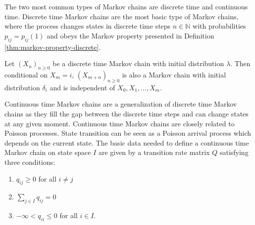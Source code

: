 
The two most common types of Markov chains are discrete time and continuous time.
Discrete time Markov chains are the most basic type of Markov chains, where the process
changes states in discrete time steps $n \in \mathbb{N}$ with probabilities $p_{ij} = p_{ij}(1)$
and obeys the Markov property presented in Definition \ref{thm:markov-property-discrete}.

\begin{defn}
\label{thm:markov-property-discrete}
Let $(X_n)_{n \ge 0}$ be a discrete time Markov chain with initial distribution $\lambda$.
Then conditional on $X_m = i$, $(X_{m + n})_{n \ge 0}$ is also a Markov chain with initial
distribution $\delta_i$ and is independent of $X_0, X_1, ..., X_m$.
\end{defn}

Continuous time Markov chains are a generalization of discrete time Markov chains as they
fill the gap between the discrete time steps and can change states at any given moment.
Continuous time Markov chains are closely related to Poisson processes. State transition can be seen as a Poisson arrival process which depends on the current state. 
%
%
The basic data needed to define a continuous time Markov chain on state space $I$ are
given by a transition rate matrix $Q$ satisfying three conditions:
\begin{enumerate}
	\item $q_{ij} \ge 0$ for all $i \ne j$
	\item $\sum_{j \in I} q_{ij} = 0$
	\item $-\infty < q_{ii} \le 0$ for all $i \in I$.
\end{enumerate}

